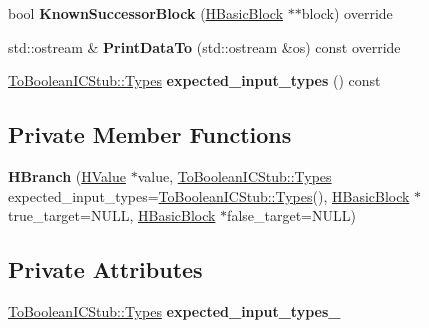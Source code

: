 \begin{DoxyCompactItemize}
\item 
bool {\bfseries Known\+Successor\+Block} (\hyperlink{classv8_1_1internal_1_1_h_basic_block}{H\+Basic\+Block} $\ast$$\ast$block) override\hypertarget{classv8_1_1internal_1_1_h_branch_a4fb264d090616e5604b0e837e980105b}{}\label{classv8_1_1internal_1_1_h_branch_a4fb264d090616e5604b0e837e980105b}

\item 
std\+::ostream \& {\bfseries Print\+Data\+To} (std\+::ostream \&os) const  override\hypertarget{classv8_1_1internal_1_1_h_branch_a8340a321c230041274452fb93281207d}{}\label{classv8_1_1internal_1_1_h_branch_a8340a321c230041274452fb93281207d}

\item 
\hyperlink{classv8_1_1internal_1_1_to_boolean_i_c_stub_1_1_types}{To\+Boolean\+I\+C\+Stub\+::\+Types} {\bfseries expected\+\_\+input\+\_\+types} () const \hypertarget{classv8_1_1internal_1_1_h_branch_a826940a2bd37a7ef9cd7223ce2d6fbed}{}\label{classv8_1_1internal_1_1_h_branch_a826940a2bd37a7ef9cd7223ce2d6fbed}

\end{DoxyCompactItemize}
\subsection*{Private Member Functions}
\begin{DoxyCompactItemize}
\item 
{\bfseries H\+Branch} (\hyperlink{classv8_1_1internal_1_1_h_value}{H\+Value} $\ast$value, \hyperlink{classv8_1_1internal_1_1_to_boolean_i_c_stub_1_1_types}{To\+Boolean\+I\+C\+Stub\+::\+Types} expected\+\_\+input\+\_\+types=\hyperlink{classv8_1_1internal_1_1_to_boolean_i_c_stub_1_1_types}{To\+Boolean\+I\+C\+Stub\+::\+Types}(), \hyperlink{classv8_1_1internal_1_1_h_basic_block}{H\+Basic\+Block} $\ast$true\+\_\+target=N\+U\+LL, \hyperlink{classv8_1_1internal_1_1_h_basic_block}{H\+Basic\+Block} $\ast$false\+\_\+target=N\+U\+LL)\hypertarget{classv8_1_1internal_1_1_h_branch_ad4b4ccf6b20ffdc6d26ec5eeeedf3a3b}{}\label{classv8_1_1internal_1_1_h_branch_ad4b4ccf6b20ffdc6d26ec5eeeedf3a3b}

\end{DoxyCompactItemize}
\subsection*{Private Attributes}
\begin{DoxyCompactItemize}
\item 
\hyperlink{classv8_1_1internal_1_1_to_boolean_i_c_stub_1_1_types}{To\+Boolean\+I\+C\+Stub\+::\+Types} {\bfseries expected\+\_\+input\+\_\+types\+\_\+}\hypertarget{classv8_1_1internal_1_1_h_branch_a73f35c7b35b1eb277ea6641f16fb111c}{}\label{classv8_1_1internal_1_1_h_branch_a73f35c7b35b1eb277ea6641f16fb111c}

\end{DoxyCompactItemize}
